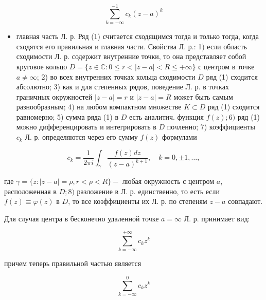 \documentclass[10pt]{article}
\begin{document}
\[

\sum_{k=-\infty}^{-1} c_{k}(z-a)^{k}

\]



\begin{itemize}

  \item главная часть Л. р. Ряд (1) считается сходящимся тогда и только тогда, когда сходятся его правильная и главная части. Свойства Л. р.: 1) если область сходимости Л. р. содержит внутренние точки, то она представляет собой круговое кольцо $D=\{z \in \mathbb{C}: 0 \leqslant r<|z-a|<R \leqslant+\infty\}$ с центром в точке $a \neq \infty$; 2) во всех внутренних точках кольца сходимости $D$ ряд (1) сходится абсолютно; 3) как и для степенных рядов, поведение Л. р. в точках граничных окружностей $|z-a|=r$ и $|z-a|=R$ может быть самым разнообразным; 4) на любом компактном множестве $K \subset D$ ряд (1) сходится равномерно; 5) сумма ряда (1) в $D$ есть аналитич. функция $f(z) ; 6)$ ряд (1) можно дифференцировать и интегрировать в $D$ почленно; 7) коэффициенты $c_{k}$ Л. р. определяются через его сумму $f(z)$ формулами

\end{itemize}



\[

c_{k}=\frac{1}{2 \pi i} \int_{\gamma} \frac{f(z) d z}{(z-a)^{k+1}}, \quad k=0, \pm 1, \ldots,

\]



где $\gamma=\{z:|z-a|=\rho, r<\rho<R\}-$ любая окружность с центром $a$, расположенная в $D ; 8)$ разложение в Л. р. единственно, то есть если $f(z) \equiv \varphi(z)$ в $D$, то все коэффициенты их Л. р. по степеням $z-a$ совпадают.



Для случая центра в бесконечно удаленной точке $a=\infty$ Л. р. принимает вид:



\[

\sum_{k=-\infty}^{+\infty} c_{k} z^{k}

\]



причем теперь правильной частью является



\[

\sum_{k=-\infty}^{0} c_{k} z^{k}

\]
\end{document}
